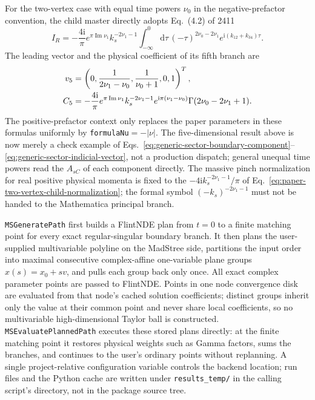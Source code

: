 \documentclass[11pt,a4paper]{article}
\newcommand{\dd}{\mathrm d}
\newcommand{\ii}{\mathrm i}
\begin{document}
For the two-vertex case with equal time powers $\nu_0$ in the negative-prefactor convention, the child master directly adopts Eq.~(4.2) of 2411
\begin{equation}
 I_R=-\frac{4\ii}{\pi}e^{\pi\operatorname{Im}\nu_1}k_s^{-2\nu_1-1}
 \int_{-\infty}^{0}\dd\tau\,(-\tau)^{2\nu_0-2\nu_1}
 e^{\ii(k_{12}+k_{34})\tau}.
 \label{eq:paper-two-vertex-child-normalization}
\end{equation}
The leading vector and the physical coefficient of its fifth branch are
\begin{align}
 v_5&=\left(0,\frac{1}{2\nu_1-\nu_0},\frac{1}{\nu_0+1},0,1\right)^T,
 \notag\\
 C_5&=-\frac{4\ii}{\pi}e^{\pi\operatorname{Im}\nu_1}
 k_s^{-2\nu_1-1}e^{\ii\pi(\nu_1-\nu_0)}
 \Gamma(2\nu_0-2\nu_1+1).
 \label{eq:paper-two-vertex-contact-boundary}
\end{align}
The positive-prefactor context only replaces the paper parameters in these formulas uniformly by \texttt{formulaNu}$=-|\nu|$. The five-dimensional result above is now merely a check example of Eqs.~\eqref{eq:generic-sector-boundary-component}--\eqref{eq:generic-sector-indicial-vector}, not a production dispatch; general unequal time powers read the $A_{sC}$ of each component directly. The massive pinch normalization for real positive physical momenta is fixed to the $-4\ii k_s^{-2\nu_1-1}/\pi$ of Eq.~\eqref{eq:paper-two-vertex-child-normalization}; the formal symbol $(-k_s)^{-2\nu_1-1}$ must not be handed to the Mathematica principal branch.

\texttt{MSGeneratePath} first builds a FlintNDE plan from $t=0$ to a finite matching point
for every exact regular-singular boundary branch. It then plans the user-supplied
multivariable polyline on the MadStree side, partitions the input order into maximal
consecutive complex-affine one-variable plane groups $x(s)=x_0+s v$, and pulls each group
back only once. All exact complex parameter points are passed to FlintNDE. Points in one
node convergence disk are evaluated from that node's cached solution coefficients; distinct
groups inherit only the value at their common point and never share local coefficients, so
no multivariable high-dimensional Taylor ball is constructed.
\texttt{MSEvaluatePlannedPath} executes these stored plans directly:
at the finite matching point it restores physical weights such as Gamma factors, sums the
branches, and continues to the user's ordinary points without replanning. A single
project-relative configuration variable controls the backend location; run files and the
Python cache are written under \texttt{results\_temp/} in the calling script's directory,
not in the package source tree.
\end{document}
